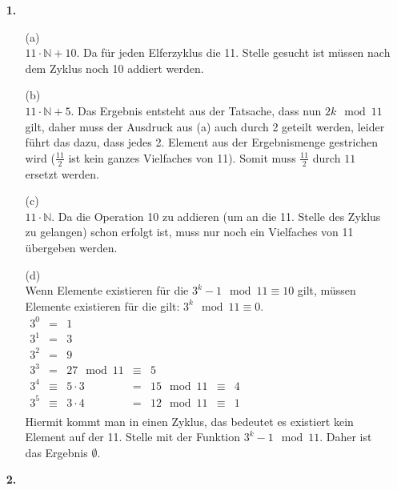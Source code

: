 \documentclass[a4paper,11pt,fleqn]{scrartcl}
\title{\titleinfo}
\author{\authorinfo}
\begin{document}
	\maketitle
	\begin{enumerate}
		\item[\textbf{1.}]
		\begin{enumerate}
			\item[(a)]\quad \\
				\(11 \cdot \mathbb{N} + 10\). Da für jeden Elferzyklus die 11. Stelle gesucht ist müssen nach dem
				Zyklus noch 10 addiert werden.
			\item[(b)]\quad \\
				\(11 \cdot \mathbb{N} + 5\). Das Ergebnis entsteht aus der Tatsache, dass nun \(2k \mod 11\)
				gilt, daher muss der Ausdruck aus (a) auch durch 2 geteilt werden, leider führt das dazu, dass
				jedes 2. Element aus der Ergebnismenge gestrichen wird (\(\frac{11}{2}\) ist kein ganzes
				Vielfaches von 11). Somit muss \(\frac{11}{2}\) durch \(11\) ersetzt werden.
			\item[(c)]\quad \\
				\(11 \cdot \mathbb{N}\). Da die Operation 10 zu addieren (um an die 11. Stelle des Zyklus zu
				gelangen) schon erfolgt ist, muss nur noch ein Vielfaches von 11 übergeben werden.
			\item[(d)]\quad \\
				Wenn Elemente existieren für die \(3^k - 1 \mod 11 \equiv 10\) gilt, müssen Elemente existieren
				für die gilt: 
				\(3^k \mod 11 \equiv 0\). \\
				\(
				\begin{array}{rclclcl}
					3^0 &=& 1 \\
					3^1 &=& 3 \\
					3^2 &=& 9 \\
					3^3 &=& 27 \mod 11 &\equiv & 5 \\
					3^4 &\equiv & 5 \cdot 3 &=& 15 \mod 11 &\equiv & 4 \\
					3^5 &\equiv & 3 \cdot 4 &=& 12 \mod 11 &\equiv & 1 \\
				\end{array}
				\) \\
				Hiermit kommt man in einen Zyklus, das bedeutet es existiert kein Element auf der 11. Stelle mit
				der Funktion \(3^k - 1 \mod 11\). Daher ist das Ergebnis \(\emptyset\).
		\end{enumerate}
		\item[\textbf{2.}]\quad \\

\end{enumerate}
\end{document}
